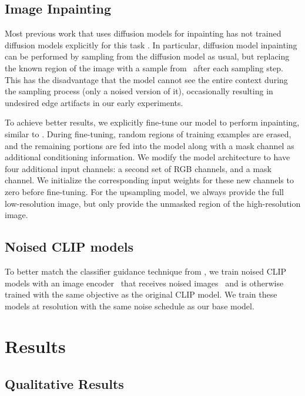 \documentclass{article}
\begin{document}
\subsection{Image Inpainting}

Most previous work that uses diffusion models for inpainting has not trained diffusion models explicitly for this task \citep{dickstein,sde,sdedit}. In particular, diffusion model inpainting can be performed by sampling from the diffusion model as usual, but replacing the known region of the image with a sample from~ after each sampling step. This has the disadvantage that the model cannot see the entire context during the sampling process (only a noised version of it), occasionally resulting in undesired edge artifacts in our early experiments.

To achieve better results, we explicitly fine-tune our model to perform inpainting, similar to \citet{palette}. During fine-tuning, random regions of training examples are erased, and the remaining portions are fed into the model along with a mask channel as additional conditioning information. We modify the model architecture to have four additional input channels: a second set of RGB channels, and a mask channel. We initialize the corresponding input weights for these new channels to zero before fine-tuning. For the upsampling model, we always provide the full low-resolution image, but only provide the unmasked region of the high-resolution image.


\subsection{Noised CLIP models}
\label{sec:clipguided_diffusion}



To better match the classifier guidance technique from \citet{sotapaper}, we train noised CLIP models with an image encoder~ that receives noised images~ and is otherwise trained with the same objective as the original CLIP model. We train these models at  resolution with the same noise schedule as our base model.


\section{Results}
\label{sec:results}

\subsection{Qualitative Results}
\label{sec:qualitative_results}
\end{document}
